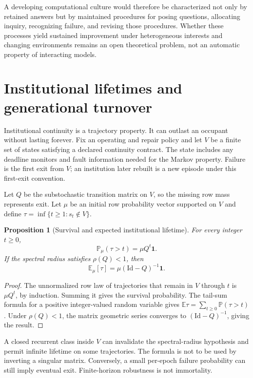 \documentclass[11pt,letterpaper]{article}
\theoremstyle{plain}
\newtheorem{proposition}{Proposition}[section]
\theoremstyle{definition}
\theoremstyle{remark}
\newcommand{\E}{\mathbb E}
\newcommand{\Prob}{\mathbb P}
\begin{document}
A developing computational culture would therefore be characterized not only by retained answers but by maintained procedures for posing questions, allocating inquiry, recognizing failure, and revising those procedures. Whether these processes yield sustained improvement under heterogeneous interests and changing environments remains an open theoretical problem, not an automatic property of interacting models.

\section{Institutional lifetimes and generational turnover}\label{sec:lifetime}
Institutional continuity is a trajectory property. It can outlast an occupant without lasting forever. Fix an operating and repair policy and let $V$ be a finite set of states satisfying a declared continuity contract. The state includes any deadline monitors and fault information needed for the Markov property. Failure is the first exit from $V$; an institution later rebuilt is a new episode under this first-exit convention.

Let $Q$ be the substochastic transition matrix on $V$, so the missing row mass represents exit. Let $\mu$ be an initial row probability vector supported on $V$ and define $\tau=\inf\{t\geq1:s_t\notin V\}$.

\begin{proposition}[Survival and expected institutional lifetime]\label{prop:lifetime}
For every integer $t\geq0$,
\[
\Prob_\mu(\tau>t)=\mu Q^t\mathbf1.
\]
If the spectral radius satisfies $\rho(Q)<1$, then
\[
\E_\mu[\tau]=\mu(\mathrm{Id}-Q)^{-1}\mathbf1.
\]
\end{proposition}
\begin{proof}
The unnormalized row law of trajectories that remain in $V$ through $t$ is $\mu Q^t$, by induction. Summing it gives the survival probability. The tail-sum formula for a positive integer-valued random variable gives $\E\tau=\sum_{t\geq0}\Prob(\tau>t)$. Under $\rho(Q)<1$, the matrix geometric series converges to $(\mathrm{Id}-Q)^{-1}$, giving the result.
\end{proof}

A closed recurrent class inside $V$ can invalidate the spectral-radius hypothesis and permit infinite lifetime on some trajectories. The formula is not to be used by inverting a singular matrix. Conversely, a small per-epoch failure probability can still imply eventual exit. Finite-horizon robustness is not immortality.
\end{document}
